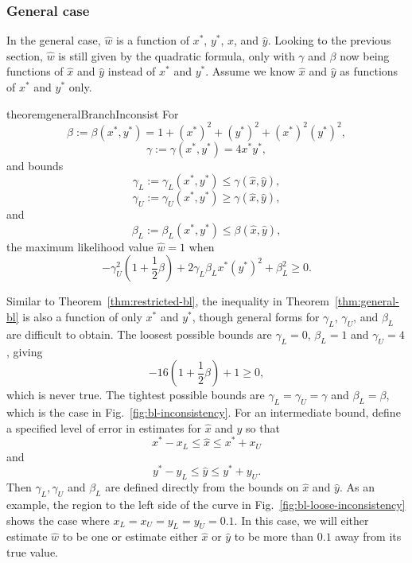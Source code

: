 \documentclass{article}
\begin{document}
\subsubsection*{General case}

In the general case, $\hat{w}$ is a function of $x^*$, $y^*$, $\hat{x}$, and $\hat{y}$.
Looking to the previous section, $\hat{w}$ is still given by the quadratic formula, only with $\gamma$ and $\beta$ now being functions of $\hat{x}$ and $\hat{y}$ instead of $x^*$ and $y^*$.
Assume we know $\hat{x}$ and $\hat{y}$ as functions of $x^*$ and $y^*$ only.
\begin{restatable}{theorem}{generalBranchInconsist}
\label{thm:general-bl}
For
$$
\beta := \beta(x^*, y^*) = 1+(x^*)^2+(y^*)^2+(x^*)^2(y^*)^2,
$$
$$
\gamma := \gamma(x^*, y^*) = 4x^*y^*,
$$
and bounds
$$
\gamma_L := \gamma_{L}(x^*, y^*) \le \gamma(\hat{x}, \hat{y}),
$$
$$
\gamma_U := \gamma_{U}(x^*, y^*) \ge \gamma(\hat{x}, \hat{y}),
$$
and
$$
\beta_L := \beta_{L}(x^*, y^*) \le \beta(\hat{x}, \hat{y}),
$$
the maximum likelihood value $\hat{w}=1$ when
$$
-\gamma_{U}^2\left(1 + \frac{1}{2}\beta\right) + 2\gamma_{L}\beta_{L}x^*(y^*)^2 + \beta_{L}^2 \ge 0.
$$
\end{restatable}
Similar to Theorem~\ref{thm:restricted-bl}, the inequality in Theorem~\ref{thm:general-bl} is also a function of only $x^*$ and $y^*$, though general forms for $\gamma_L$, $\gamma_U$, and $\beta_L$ are difficult to obtain.
The loosest possible bounds are $\gamma_{L} = 0$, $\beta_{L} = 1$ and $\gamma_{U} = 4$, giving
$$
-16\left(1 + \frac{1}{2}\beta\right) + 1 \ge 0,
$$
which is never true.
The tightest possible bounds are $\gamma_{L} = \gamma_{U} = \gamma$ and $\beta_{L} = \beta$, which is the case in Fig.~\ref{fig:bl-inconsistency}.
For an intermediate bound, define a specified level of error in estimates for $\hat{x}$ and $\hat{y}$ so that
$$
x^*-x_{L} \le \hat{x} \le x^*+x_{U}
$$
and
$$
y^*-y_{L} \le \hat{y} \le y^*+y_{U}.
$$
Then $\gamma_L, \gamma_U$ and $\beta_L$ are defined directly from the bounds on $\hat{x}$ and $\hat{y}$.
As an example, the region to the left side of the curve in Fig.~\ref{fig:bl-loose-inconsistency} shows the case where $x_L=x_U=y_L=y_U=0.1$.
In this case, we will either estimate $\hat{w}$ to be one or estimate either $\hat{x}$ or $\hat{y}$ to be more than $0.1$ away from its true value.
\end{document}

